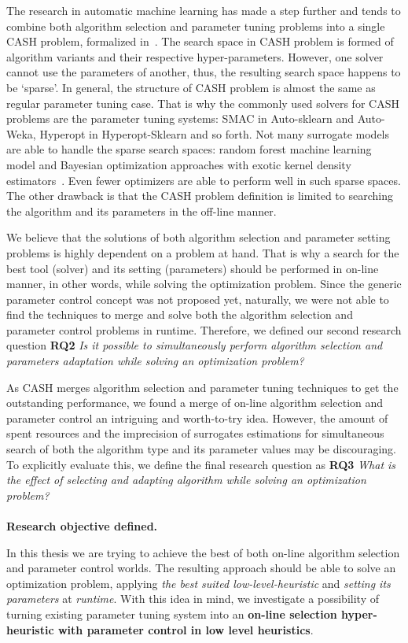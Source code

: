 The research in automatic machine learning has made a step further and tends to combine both algorithm selection and parameter tuning problems into a single CASH problem, formalized in~\cite{thornton2013auto}. The search space in CASH problem is formed of algorithm variants and their respective hyper-parameters. However, one solver cannot use the parameters of another, thus, the resulting search space happens to be `sparse'. In general, the structure of CASH problem is almost the same as regular parameter tuning case. That is why the commonly used solvers for CASH problems are the parameter tuning systems: SMAC in Auto-sklearn and Auto-Weka, Hyperopt in Hyperopt-Sklearn and so forth.
Not many surrogate models are able to handle the sparse search spaces: random forest machine learning model and Bayesian optimization approaches with exotic kernel density estimators~\cite{levesque2017bayesian}. Even fewer optimizers are able to perform well in such sparse spaces.
The other drawback is that the CASH problem definition is limited to searching the algorithm and its parameters in the off-line manner.

We believe that the solutions of both algorithm selection and parameter setting problems is highly dependent on a problem at hand.
That is why a search for the best tool (solver) and its setting (parameters) should be performed in on-line manner, in other words, while solving the optimization problem. Since the generic parameter control concept was not proposed yet, naturally, we were not able to find the techniques to merge and solve both the algorithm selection and parameter control problems in runtime. Therefore, we defined our second research question \textbf{RQ2} \emph{Is it possible to simultaneously perform algorithm selection and parameters adaptation while solving an optimization problem?}

As CASH merges algorithm selection and parameter tuning techniques to get the outstanding performance, we found a merge of on-line algorithm selection and parameter control an intriguing and worth-to-try idea. However, the amount of spent resources and the imprecision of surrogates estimations for simultaneous search of both the algorithm type and its parameter values may be discouraging. To explicitly evaluate this, we define the final research question as \textbf{RQ3} \emph{What is the effect of selecting and adapting algorithm while solving an optimization problem?}

\paragraph{}
\textbf{Research objective defined.}

In this thesis we are trying to achieve the best of both on-line algorithm selection and parameter control worlds. The resulting approach should be able to solve an optimization problem, applying \emph{the best suited low-level-heuristic} and \emph{setting its parameters} at \emph{runtime}. With this idea in mind, we investigate a possibility of turning existing parameter tuning system into an \textbf{on-line selection hyper-heuristic with parameter control in low level heuristics}.
